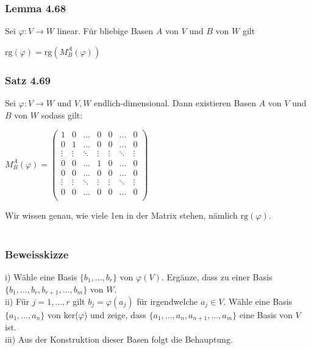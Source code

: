 \documentclass{article}
\begin{document}
\subsubsection*{Lemma 4.68}
Sei $\varphi: V \rightarrow W$ linear. Für bliebige Basen $A$ von $V$ und $B$ von $W$ gilt \\
\begin{center}
    $\text{rg}(\varphi) = \text{rg}(M_B^{A}(\varphi))$ \\
\end{center}
\subsubsection*{Satz 4.69}
Sei $\varphi: V \rightarrow W$ und $V, W$ endlich-dimensional. Dann existieren Basen $A$ von $V$ und $B$ von $W$ sodass gilt: \\
\begin{center}
    $M_B^{A}(\varphi) = \begin{pmatrix}
        1 & 0 & ... & 0 & 0 & ... & 0 \\
        0 & 1 & ... & 0 & 0 & ... & 0 \\
        \vdots & \vdots & \ddots & \vdots & \vdots & \ddots & \vdots \\
        0 & 0 & ... & 1 & 0 & ... & 0 \\
        0 & 0 & ... & 0 & 0 & ... & 0 \\
        \vdots & \vdots & \ddots & \vdots & \vdots & \ddots & \vdots \\
        0 & 0 & ... & 0 & 0 & ... & 0 \\
    \end{pmatrix}$ \\
\end{center}
Wir wissen genau, wie viele 1en in der Matrix stehen, nämlich $\text{rg}(\varphi)$. \\
\\
\subsubsection*{Beweisskizze}
i) Wähle eine Basis $\{b_1, ... , b_r\}$ von $\varphi(V)$. Ergänze, dass zu einer Basis $\{b_1, ... , b_r, b_{r+1}, ... , b_m\}$ von $W$. \\
ii) Für $j=1,...,r$ gilt $b_j = \varphi(a_j)$ für irgendwelche $a_j \in V$. 
Wähle eine Basis $\{a_1, ... , a_n\}$ von ker($\varphi$) und zeige, dass $\{a_1, ... , a_n, a_{n+1}, ... , a_m\}$ eine Basis von $V$ ist. \\
iii) Aus der Konstruktion dieser Basen folgt die Behauptung. \\
\\
\end{document}
